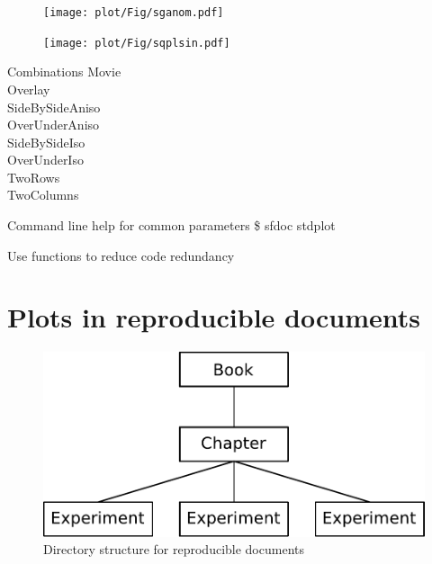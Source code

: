 \begin{frame}
  \begin{figure}
  \texttt{[image: plot/Fig/sganom.pdf]}
  \end{figure}
\end{frame}

\begin{frame}
  \begin{figure}
  \texttt{[image: plot/Fig/sqplsin.pdf]}
  \end{figure}
\end{frame}

\begin{frame}
  \begin{block}{Combinations}
    Movie \\
    Overlay \\
    SideBySideAniso \\
    OverUnderAniso \\
    SideBySideIso \\
    OverUnderIso \\
    TwoRows \\
    TwoColumns
  \end{block}
  \begin{block}{Command line help for common parameters}
    \$ sfdoc stdplot
  \end{block}
  \begin{block}{Use functions to reduce code redundancy}
   
  \end{block}
\end{frame}

\section{Plots in reproducible documents}

\begin{frame}
  \begin{figure}
  \includegraphics[scale=0.55]{Fig/pstruct.pdf}
  \caption{Directory structure for reproducible documents}
  \end{figure}
\end{frame}

